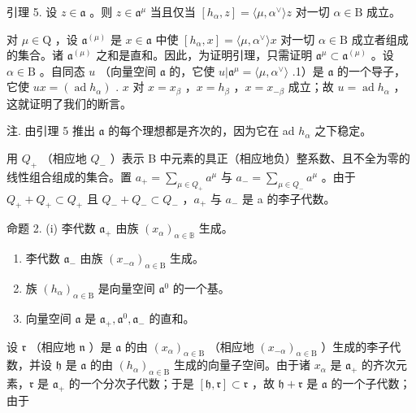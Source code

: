 引理 5. 设 \(z \in \mathfrak{a}\) 。则 \(z \in \mathfrak{a}^{\mu}\) 当且仅当 \([h_{\alpha}, z] = \langle \mu, \alpha^{\vee} \rangle z\) 对一切 \(\alpha \in \mathrm{B}\) 成立。

对 \(\mu \in \mathrm{Q}\) ，设 \(\mathfrak{a}^{(\mu)}\) 是 \(x \in \mathfrak{a}\) 中使 \([h_{\alpha}, x] = \langle \mu, \alpha^{\vee} \rangle x\) 对一切 \(\alpha \in \mathrm{B}\) 成立者组成的集合。诸 \(\mathfrak{a}^{(\mu)}\) 之和是直和。因此，为证明引理，只需证明 \(\mathfrak{a}^{\mu} \subset \mathfrak{a}^{(\mu)}\) 。设 \(\alpha \in \mathrm{B}\) 。自同态 \(u\) （向量空间 \(\mathfrak{a}\) 的，它使 \(u|\mathfrak{a}^{\mu} = \langle \mu, \alpha^{\vee} \rangle\) .1）是 \(\mathfrak{a}\) 的一个导子，它使 \(ux = (\operatorname{ad} h_{\alpha})\) . \(x\) 对 \(x = x_{\beta}\) ，\(x = h_{\beta}\) ，\(x = x_{-\beta}\) 成立；故 \(u = \operatorname{ad} h_{\alpha}\) ，这就证明了我们的断言。

注. 由引理 5 推出 \(\mathfrak{a}\) 的每个理想都是齐次的，因为它在 ad \(h_{\alpha}\) 之下稳定。

用 \(Q_{+}\) （相应地 \(Q_{-}\) ）表示 B 中元素的具正（相应地负）整系数、且不全为零的线性组合组成的集合。置 \(a_{+} = \sum_{\mu \in Q_{+}} a^{\mu}\) 与 \(a_{-} = \sum_{\mu \in Q_{-}} a^{\mu}\) 。由于 \(Q_{+} + Q_{+} \subset Q_{+}\) 且 \(Q_{-} + Q_{-} \subset Q_{-}\) ，\(a_{+}\) 与 \(a_{-}\) 是 a 的李子代数。

命题 2. (i) 李代数 \(\mathfrak{a}_{+}\) 由族 \((x_{\alpha})_{\alpha \in \mathbb{B}}\) 生成。

\begin{enumerate}
\def\labelenumi{(\roman{enumi})}
\setcounter{enumi}{1}
\item
  李代数 \(\mathfrak{a}_{-}\) 由族 \((x_{-\alpha})_{\alpha \in \mathrm{B}}\) 生成。
\item
  族 \((h_{\alpha})_{\alpha \in \mathrm{B}}\) 是向量空间 \(\mathfrak{a}^0\) 的一个基。
\item
  向量空间 \(\mathfrak{a}\) 是 \(\mathfrak{a}_{+},\mathfrak{a}^{0},\mathfrak{a}_{-}\) 的直和。
\end{enumerate}

设 \(\mathfrak{r}\) （相应地 \(\mathfrak{n}\) ）是 \(\mathfrak{a}\) 的由 \((x_{\alpha})_{\alpha \in \mathrm{B}}\) （相应地 \((x_{-\alpha})_{\alpha \in \mathrm{B}}\) ）生成的李子代数，并设 \(\mathfrak{h}\) 是 \(\mathfrak{a}\) 的由 \((h_{\alpha})_{\alpha \in \mathrm{B}}\) 生成的向量子空间。由于诸 \(x_{\alpha}\) 是 \(\mathfrak{a}_{+}\) 的齐次元素，\(\mathfrak{r}\) 是 \(\mathfrak{a}_{+}\) 的一个分次子代数；于是 \([\mathfrak{h},\mathfrak{r}]\subset \mathfrak{r}\) ，故 \(\mathfrak{h} + \mathfrak{r}\) 是 \(\mathfrak{a}\) 的一个子代数；由于

